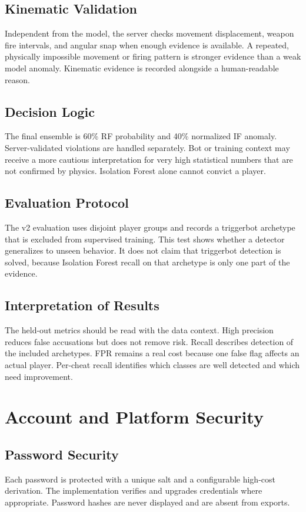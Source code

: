 \documentclass[12pt,a4paper,oneside]{report}
\begin{document}
\section{Kinematic Validation}
Independent from the model, the server checks movement displacement, weapon fire intervals, and angular snap when enough evidence is available. A repeated, physically impossible movement or firing pattern is stronger evidence than a weak model anomaly. Kinematic evidence is recorded alongside a human-readable reason.

\section{Decision Logic}
The final ensemble is 60\% RF probability and 40\% normalized IF anomaly. Server-validated violations are handled separately. Bot or training context may receive a more cautious interpretation for very high statistical numbers that are not confirmed by physics. Isolation Forest alone cannot convict a player.

\section{Evaluation Protocol}
The v2 evaluation uses disjoint player groups and records a triggerbot archetype that is excluded from supervised training. This test shows whether a detector generalizes to unseen behavior. It does not claim that triggerbot detection is solved, because Isolation Forest recall on that archetype is only one part of the evidence.

\section{Interpretation of Results}
The held-out metrics should be read with the data context. High precision reduces false accusations but does not remove risk. Recall describes detection of the included archetypes. FPR remains a real cost because one false flag affects an actual player. Per-cheat recall identifies which classes are well detected and which need improvement.

\chapter{Account and Platform Security}
\section{Password Security}
Each password is protected with a unique salt and a configurable high-cost derivation. The implementation verifies and upgrades credentials where appropriate. Password hashes are never displayed and are absent from exports.
\end{document}
